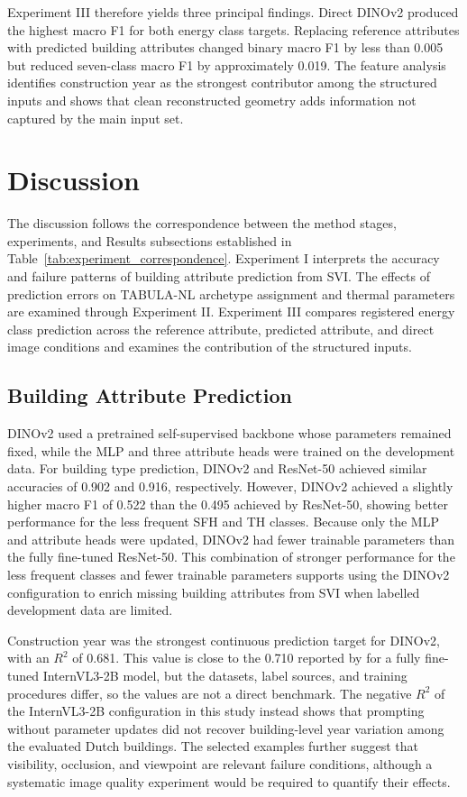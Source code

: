 Experiment III therefore yields three principal findings. Direct DINOv2 produced the highest macro F1 for both energy class targets. Replacing reference attributes with predicted building attributes changed binary macro F1 by less than 0.005 but reduced seven-class macro F1 by approximately 0.019. The feature analysis identifies construction year as the strongest contributor among the structured inputs and shows that clean reconstructed geometry adds information not captured by the main input set.

\section{Discussion}
\label{sec:discussion}

The discussion follows the correspondence between the method stages, experiments, and Results subsections established in Table~\ref{tab:experiment_correspondence}. Experiment I interprets the accuracy and failure patterns of building attribute prediction from \Ac{SVI}. The effects of prediction errors on TABULA-NL archetype assignment and thermal parameters are examined through Experiment II. Experiment III compares registered energy class prediction across the reference attribute, predicted attribute, and direct image conditions and examines the contribution of the structured inputs.

\subsection{Building Attribute Prediction}

DINOv2 used a pretrained self-supervised backbone whose parameters remained fixed, while the MLP and three attribute heads were trained on the development data. For building type prediction, DINOv2 and ResNet-50 achieved similar accuracies of 0.902 and 0.916, respectively. However, DINOv2 achieved a slightly higher macro F1 of 0.522 than the 0.495 achieved by ResNet-50, showing better performance for the less frequent SFH and TH classes. Because only the MLP and attribute heads were updated, DINOv2 had fewer trainable parameters than the fully fine-tuned ResNet-50. This combination of stronger performance for the less frequent classes and fewer trainable parameters supports using the DINOv2 configuration to enrich missing building attributes from \Ac{SVI} when labelled development data are limited.

Construction year was the strongest continuous prediction target for DINOv2, with an $R^2$ of 0.681. This value is close to the 0.710 reported by \textcite{liang2025} for a fully fine-tuned InternVL3-2B model, but the datasets, label sources, and training procedures differ, so the values are not a direct benchmark. The negative $R^2$ of the InternVL3-2B configuration in this study instead shows that prompting without parameter updates did not recover building-level year variation among the evaluated Dutch buildings. The selected examples further suggest that visibility, occlusion, and viewpoint are relevant failure conditions, although a systematic image quality experiment would be required to quantify their effects.


